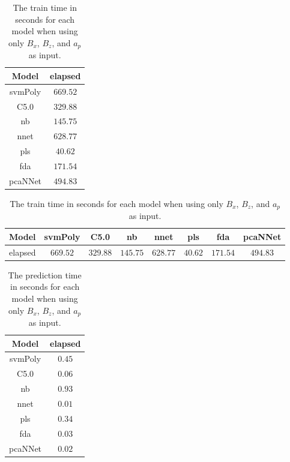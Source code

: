 \begin{table}[!ht]
	\centering
	\begin{tabular}{|c|c|}
		\hline
		Model & elapsed \\ \hline
		svmPoly & $669.52$ \\ \hline
		C5.0 & $329.88$ \\ \hline
		nb & $145.75$ \\ \hline
		nnet & $628.77$ \\ \hline
		pls & $40.62$ \\ \hline
		fda & $171.54$ \\ \hline
		pcaNNet & $494.83$ \\ \hline
	\end{tabular}
	\caption{The train time in seconds for each model when using only $B_{x}$, $B_{z}$, and $a_{p}$ as input.}
	\label{tab:time:xzap:train}
\end{table}

\begin{table}[!ht]
	\centering
	\begin{tabular}{|c|c|c|c|c|c|c|c|}
		\hline
		Model & svmPoly & C5.0 & nb & nnet & pls & fda & pcaNNet \\ \hline
		elapsed & $669.52$ & $329.88$ & $145.75$ & $628.77$ & $40.62$ & $171.54$ & $494.83$ \\ \hline
	\end{tabular}
	\caption{The train time in seconds for each model when using only $B_{x}$, $B_{z}$, and $a_{p}$ as input.}
	\label{tab:time:reverse:xzap:train}
\end{table}

\begin{table}[!ht]
	\centering
	\begin{tabular}{|c|c|}
		\hline
		Model & elapsed \\ \hline
		svmPoly & $0.45$ \\ \hline
		C5.0 & $0.06$ \\ \hline
		nb & $0.93$ \\ \hline
		nnet & $0.01$ \\ \hline
		pls & $0.34$ \\ \hline
		fda & $0.03$ \\ \hline
		pcaNNet & $0.02$ \\ \hline
	\end{tabular}
	\caption{The prediction time in seconds for each model when using only $B_{x}$, $B_{z}$, and $a_{p}$ as input.}
	\label{tab:time:xzap:predict}
\end{table}

